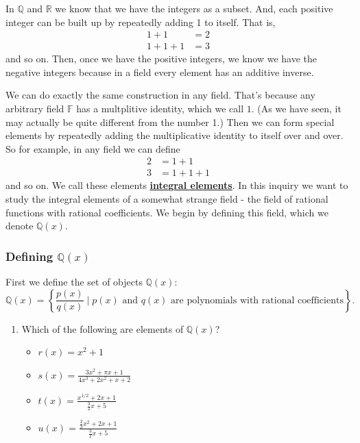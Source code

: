 \documentclass[11pt]{article}
\newenvironment{task}
	{\begin{mdframed}[linecolor=lightgray, linewidth=3pt]\raggedright}
	{\end{mdframed}}
\renewcommand\emph[1]{\underline{\bf{#1}}} %
\theoremstyle{definition}
\begin{document}
\begin{task}
In $\mathbb{Q}$ and $\mathbb{R}$ we know that we have the integers as a subset. And, each positive integer can be built up by repeatedly adding 1 to itself.
That is,
\begin{align*}
  1 + 1 &= 2\\
  1+ 1 + 1 &= 3
\end{align*}
and so on. Then, once we have the positive integers, we know we have the negative integers because in a field every element has an additive inverse. 

We can do exactly the same construction in any field. That's because any arbitrary field $\mathbb{F}$ has a multplitive identity, which we call $1$. (As we have seen,
it may actually be quite different from the number 1.) Then we can form special elements by repeatedly adding the multiplicative identity to itself over and
over. So for example, in any field we can define
\begin{align*}
  2 &= 1 + 1\\
  3 &= 1 + 1 + 1
\end{align*}
and so on. We call these elements \emph{integral elements}. In this inquiry we want to study the integral elements of a somewhat strange field - the field
of rational functions with rational coefficients. We begin by defining this field, which we denote $\mathbb{Q}(x)$.

\subsubsection{Defining $\mathbb{Q}(x)$}

First we define the set of objects $\mathbb{Q}(x)$:
\[ \mathbb{Q}(x) = \left\{ \frac{p(x)}{q(x)} \mid p(x) \text{ and }q(x)\text{ are polynomials with rational coefficients} \right\}.\]

\begin{enumerate}
  \item Which of the following are elements of $\mathbb{Q}(x)$?
    \begin{itemize}
      \item $r(x) = x^2 + 1$
      \item $s(x) = \frac{3x^2+\pi x + 1}{4x^3 + 2x^2 + x + 2}$
      \item $t(x) = \frac{x^{1/2}+2x + 1}{\frac{3}{2}x+5}$
      \item $u(x) = \frac{\frac{2}{3}x^2+2x + 1}{\frac{3}{2}x+5}$
    \end{itemize}
\end{enumerate}


\end{task}
\end{document}
